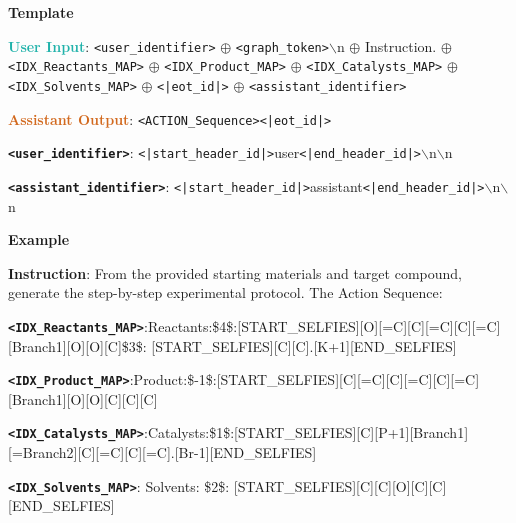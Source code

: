 \begin{tcolorbox}[colback=white!98!black,colframe=white!30!black,boxsep=1.1pt,top=6.75pt]%
\scriptsize
\noindent\makebox[\textwidth]{\rule{\textwidth}{1pt}}
\textbf{Template}
\\[-0.575em]
\noindent\makebox[\textwidth]{\rule{\textwidth}{1pt}}

\textbf{\textcolor[HTML]{20B2AA}{User Input}}: {\tt <user\_identifier>} $\oplus$ {\tt <graph\_token>}$\backslash$n $\oplus$ Instruction. $\oplus$ {\tt <IDX\_Reactants\_MAP>} $\oplus$ {\tt <IDX\_Product\_MAP>} $\oplus$ {\tt <IDX\_Catalysts\_MAP>} $\oplus$ {\tt <IDX\_Solvents\_MAP>} $\oplus$ {\tt <|eot\_id|>} $\oplus$ {\tt <assistant\_identifier>}

\textbf{\textcolor[HTML]{D2691E}{Assistant Output}}: {\tt <ACTION\_Sequence>}{\tt <|eot\_id|>}

{\tt \textbf{<user\_identifier>}}: {\tt <|start\_header\_id|>}user{\tt <|end\_header\_id|>}$\backslash$n$\backslash$n

{\tt \textbf{<assistant\_identifier>}}: {\tt <|start\_header\_id|>}assistant{\tt <|end\_header\_id|>}$\backslash$n$\backslash$n

\noindent\makebox[\textwidth]{\rule{\textwidth}{1pt}}
\textbf{Example}
\\[-0.575em]
\noindent\makebox[\textwidth]{\rule{\textwidth}{1pt}}

\begin{tcolorbox}[colback=cyan!7!white,colframe=white!98!black,boxsep=1.1pt,top=6.75pt]
\textbf{Instruction}: From the provided starting materials and target compound, generate the step-by-step experimental protocol. The Action Sequence:

{\tt \textbf{<IDX\_Reactants\_MAP>}}:Reactants:\$4\$:[START\_SELFIES][O][=C][C][=C][C][=C][Branch1][O][O][C] \$3\$: [START\_SELFIES][C][C]\-[Branch1][C][C][Branch1][C][C][O-1].[K+1][END\_SELFIES]

{\tt \textbf{<IDX\_Product\_MAP>}}:Product:\$-1\$:[START\_SELFIES][C][=C][C][=C][C][=C][Branch1][O][O][C][C][C]

{\tt \textbf{<IDX\_Catalysts\_MAP>}}:Catalysts:\$1\$:[START\_SELFIES][C][P+1][Branch1][=Branch2][C][=C][C][=C]\-[C][=C][Ring1][=Branch1][Branch1][=Branch2] [C][=C][C][=C][C][=C][Ring1][=Branch1][C][=C][C][=C]\-[C][=C][Ring1][=Branch1].[Br-1][END\_SELFIES]

{\tt \textbf{<IDX\_Solvents\_MAP>}}: Solvents: \$2\$: [START\_SELFIES][C][C][O][C][C][END\_SELFIES]


\end{tcolorbox}
\end{tcolorbox}
